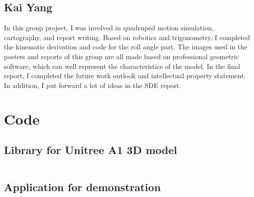 \section{Kai Yang}

In this group project, I was involved in quadruped motion simulation, cartography, and report writing. Based on robotics and trigonometry, I completed the kinematic derivation and code for the roll angle part. The images used in the posters and reports of this group are all made based on professional geometric software, which can well represent the characteristics of the model. In the final report, I completed the future work outlook and intellectual property statement. In addition, I put forward a lot of ideas in the SDE report.


\chapter{Code}

\section{Library for Unitree A1 3D model}
\inputminted[fontsize=\tiny, breaklines]{python}{../simulation/liba1.py}

\section{Application for demonstration}
\inputminted[fontsize=\tiny, breaklines]{python}{../simulation/pose_control.py}
